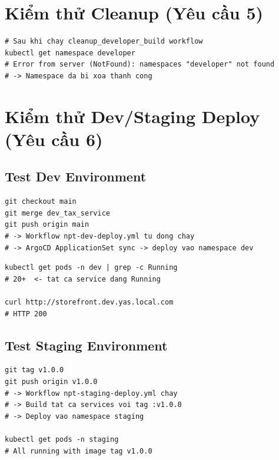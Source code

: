 \section{Kiểm thử Cleanup (Yêu cầu 5)}

\begin{lstlisting}[style=bashstyle, caption=Test cleanup workflow]
# Sau khi chay cleanup_developer_build workflow
kubectl get namespace developer
# Error from server (NotFound): namespaces "developer" not found
# -> Namespace da bi xoa thanh cong
\end{lstlisting}

\section{Kiểm thử Dev/Staging Deploy (Yêu cầu 6)}

\subsection{Test Dev Environment}

\begin{lstlisting}[style=bashstyle, caption=Trigger dev deploy bằng push vào main]
git checkout main
git merge dev_tax_service
git push origin main
# -> Workflow npt-dev-deploy.yml tu dong chay
# -> ArgoCD ApplicationSet sync -> deploy vao namespace dev
\end{lstlisting}

\begin{lstlisting}[style=bashstyle, caption=Kiểm tra namespace dev]
kubectl get pods -n dev | grep -c Running
# 20+  <- tat ca service dang Running

curl http://storefront.dev.yas.local.com
# HTTP 200
\end{lstlisting}

\subsection{Test Staging Environment}

\begin{lstlisting}[style=bashstyle, caption=Trigger staging deploy bằng tag]
git tag v1.0.0
git push origin v1.0.0
# -> Workflow npt-staging-deploy.yml chay
# -> Build tat ca services voi tag :v1.0.0
# -> Deploy vao namespace staging

kubectl get pods -n staging
# All running with image tag v1.0.0
\end{lstlisting}

